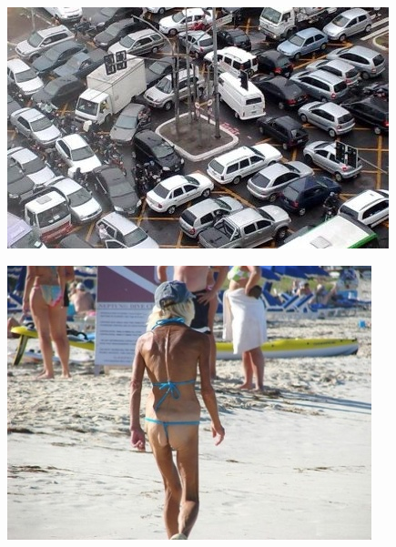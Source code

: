 \documentclass[a4paper,10pt]{article}
\begin{document}
\begin{center}
\includegraphics[scale=1]{d.jpg}
\end{center}
\begin{center}
\includegraphics[scale=1]{a.jpg}
\end{center}
\end{document}
